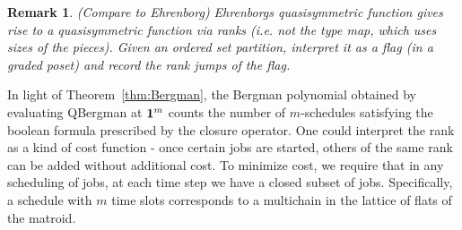\documentclass[12pt,reqno]{amsart}
\numberwithin{definition}{section}
\newtheorem{remark}[definition]{Remark}
\begin{document}
\begin{remark}
(Compare to Ehrenborg)
Ehrenborgs quasisymmetric function gives rise to a quasisymmetric function via ranks (i.e. not the type map, which uses sizes of the pieces).  Given an ordered set partition, interpret it as a flag (in a graded poset) and record the rank jumps of the flag.  





\end{remark}














In light of Theorem~\ref{thm:Bergman}, the Bergman polynomial obtained
by evaluating QBergman at ${\bf 1}^m$ counts the number of
$m$-schedules satisfying the boolean formula prescribed by the closure
operator.  One could interpret the rank as a kind of cost function -
once certain jobs are started, others of the same rank can be added
without additional cost.  To minimize cost, we require that in any
scheduling of jobs, at each time step we have a closed subset of jobs.
Specifically, a schedule with $m$ time slots corresponds to a
multichain in the lattice of flats of the matroid.  
\end{document}
